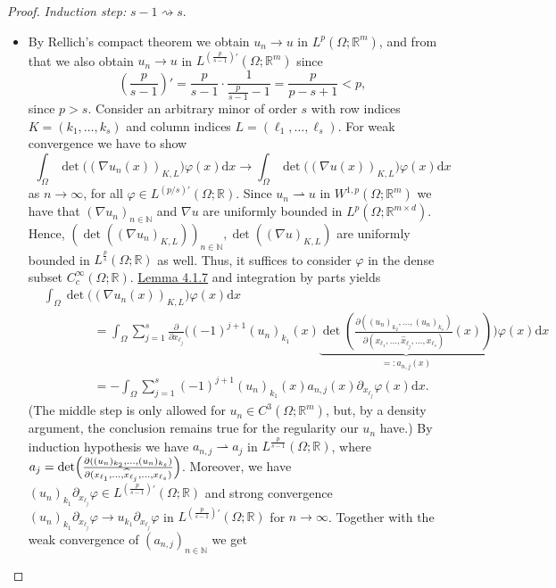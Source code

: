 \begin{proof}
\textit{Induction step:} $s-1\rightsquigarrow s$.
\begin{itemize}
	\item[] By Rellich's compact theorem we obtain $u_n\to u$ in $L^p(\Omega;\mathbb{R}^m)$, and from that we also obtain $u_n\to u$ in $L^{(\frac{p}{s-1})'}(\Omega;\mathbb{R}^m)$ since
	\[\left(\frac{p}{s-1}\right)'=\frac{p}{s-1}\cdot\frac{1}{\frac{p}{s-1}-1}=\frac{p}{p-s+1}<p,\]
	since $p>s$. Consider an arbitrary minor of order $s$ with row indices $K=(k_1,\dotsc,k_s)$ and column indices $L=(\ell_1,\dotsc,\ell_s)$. For weak convergence we have to show
	\[\int_\Omega{\det\bigl((\nabla u_n(x))_{K,L}\bigr)\varphi(x)\mathrm{d}x}\to\int_\Omega{\det\bigl((\nabla u(x))_{K,L}\bigr)\varphi(x)\mathrm{d}x}\]
	as $n\to\infty$, for all $\varphi\in L^{(p/s)'}(\Omega;\mathbb{R})$. Since $u_n\rightharpoonup u$ in $W^{1,p}(\Omega;\mathbb{R}^m)$ we have that $(\nabla u_n)_{n\in\mathbb{N}}$ and $\nabla u$ are uniformly bounded in $L^p(\Omega;\mathbb{R}^{m\times d})$. Hence, $(\det((\nabla u_n)_{K,L}))_{n\in\mathbb{N}},\det((\nabla u)_{K,L})$ are uniformly bounded in $L^{\frac{p}{s}}(\Omega;\mathbb{R})$ as well. Thus, it suffices to consider $\varphi$ in the dense subset $C_c^\infty(\Omega;\mathbb{R})$. \hyperlink{lemma_4_1_7}{Lemma 4.1.7} and integration by parts yields
	\begin{align*}
		&\int_\Omega{\det\bigl((\nabla u_n(x))_{K,L}\bigr)\varphi(x)\mathrm{d}x}\\
		&\qquad\qquad=\int_\Omega{\sum_{j=1}^s{\frac{\partial}{\partial x_{\ell_j}}\Biggl((-1)^{j+1}(u_n)_{k_1}(x)\underbrace{\det\left(\frac{\partial((u_n)_{k_2},\dotsc,(u_n)_{k_s})}{\partial(x_{\ell_1},\dotsc,\widehat{x}_{\ell_j},\dotsc,x_{\ell_s})}(x)\right)}_{=:a_{n,j}(x)}\Biggr)}\varphi(x)\mathrm{d}x}\\
		&\qquad\qquad=-\int_\Omega{\sum_{j=1}^s{(-1)^{j+1}(u_n)_{k_1}(x)a_{n,j}(x)\partial_{x_{\ell_j}}\varphi(x)}\mathrm{d}x}.
	\end{align*}
	(The middle step is only allowed for $u_n\in C^3(\Omega;\mathbb{R}^m)$, but, by a density argument, the conclusion remains true for the regularity our $u_n$ have.) By induction hypothesis we have $a_{n,j}\rightharpoonup a_j$ in $L^{\frac{p}{s-1}}(\Omega;\mathbb{R})$, where $a_j=\det\Bigl(\frac{\partial((u_n)_{k_2},\dotsc,(u_n)_{k_s})}{\partial(x_{\ell_1},\dotsc,\widehat{x}_{\ell_j},\dotsc,x_{\ell_s})}\Bigr)$. Moreover, we have $(u_n)_{k_1}\partial_{x_{\ell_j}}\varphi\in L^{(\frac{p}{s-1})'}(\Omega;\mathbb{R})$ and strong convergence $(u_n)_{k_1}\partial_{x_{\ell_j}}\varphi\to u_{k_1}\partial_{x_{\ell_j}}\varphi$ in $L^{(\frac{p}{s-1})'}(\Omega;\mathbb{R})$ for $n\to\infty$. Together with the weak convergence of $(a_{n,j})_{n\in\mathbb{N}}$ we get

\end{itemize}
\end{proof}
